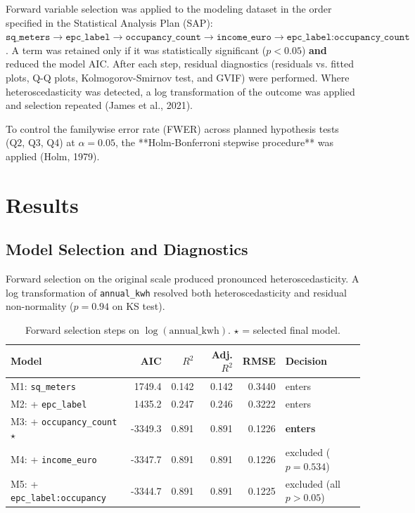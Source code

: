 \documentclass[11pt, a4paper]{article}
\begin{document}
Forward variable selection was applied to the modeling dataset in the order specified in the Statistical Analysis Plan (SAP): $\texttt{sq\_meters} \to \texttt{epc\_label} \to \texttt{occupancy\_count} \to \texttt{income\_euro} \to \texttt{epc\_label:occupancy\_count}$. A term was retained only if it was statistically significant ($p < 0.05$) \textbf{and} reduced the model AIC. After each step, residual diagnostics (residuals vs. fitted plots, Q-Q plots, Kolmogorov-Smirnov test, and GVIF) were performed. Where heteroscedasticity was detected, a log transformation of the outcome was applied and selection repeated (James et al., 2021).

To control the familywise error rate (FWER) across planned hypothesis tests (Q2, Q3, Q4) at $\alpha = 0.05$, the **Holm-Bonferroni stepwise procedure** was applied (Holm, 1979).

\section{Results}\label{sec:results}

\subsection{Model Selection and Diagnostics}\label{subsec:selection}

Forward selection on the original scale produced pronounced heteroscedasticity. A log transformation of \texttt{annual\_kwh} resolved both heteroscedasticity and residual non-normality ($p = 0.94$ on KS test).

\begin{table}[H]
\centering
\caption{Forward selection steps on $\log(\text{annual\_kwh})$. $\star$ = selected final model.}\label{tab:selection}
\begin{tabular}{lrrrrl}
\toprule
\textbf{Model} & \textbf{AIC} & \textbf{$R^2$} & \textbf{Adj. $R^2$} & \textbf{RMSE} & \textbf{Decision} \\
\midrule
M1: \texttt{sq\_meters} & 1749.4 & 0.142 & 0.142 & 0.3440 & enters \\
M2: + \texttt{epc\_label} & 1435.2 & 0.247 & 0.246 & 0.3222 & enters \\
M3: + \texttt{occupancy\_count} $\mathbf{\star}$ & -3349.3 & 0.891 & 0.891 & 0.1226 & \textbf{enters} \\
M4: + \texttt{income\_euro} & -3347.7 & 0.891 & 0.891 & 0.1226 & excluded ($p = 0.534$) \\
M5: + \texttt{epc\_label:occupancy} & -3344.7 & 0.891 & 0.891 & 0.1225 & excluded (all $p > 0.05$) \\
\bottomrule
\end{tabular}
\end{table}
\end{document}
